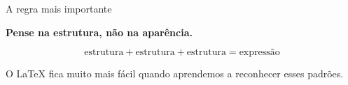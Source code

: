 \documentclass[aspectratio=169,xcolor=dvipsnames]{beamer}
\begin{document}
\begin{frame}{A regra mais importante}

    \begin{center}

        \Large
        \textbf{Pense na estrutura, não na aparência.}

        \vspace{1cm}

        \[
            \boxed{
            \text{estrutura}
            +
            \text{estrutura}
            +
            \text{estrutura}
            =
            \text{expressão}
            }
        \]

        \vspace{0.8cm}

        \normalsize

        O LaTeX fica muito mais fácil quando aprendemos
        a reconhecer esses padrões.

    \end{center}

\end{frame}

\end{document}
